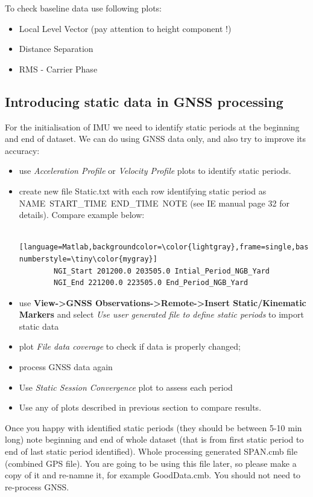 \documentclass[british]{book}
\renewcommand{\footnotesize}{\scriptsize} %
\begin{document}
To check baseline data use following plots:

\begin{itemize}
	\item Local Level Vector (pay attention to height component !)
	\item Distance Separation
	\item RMS - Carrier Phase
\end{itemize}

\subsection{Introducing static data in GNSS processing}

For the initialisation of IMU we need to identify static periods at the beginning and end of dataset. We can do using GNSS data only, and also try to improve its accuracy:

\begin{itemize}
\item use \emph{Acceleration Profile} or \emph{Velocity Profile} plots to
identify static periods.
\item create new file Static.txt with each row identifying static period as NAME~START\_TIME~END\_TIME~NOTE (see IE manual page 32 for details). Compare example below: 
	\begin{lstlisting} [language=Matlab,backgroundcolor=\color{lightgray},frame=single,basicstyle=\footnotesize,numbers=left,numbersep=5pt, numberstyle=\tiny\color{mygray}]
		NGI_Start 201200.0 203505.0 Intial_Period_NGB_Yard
		NGI_End 221200.0 223505.0 End_Period_NGB_Yard
	\end{lstlisting}
\item use \textbf{View->GNSS Observations->Remote->Insert Static/Kinematic Markers} and select \textit{Use user generated file to define static periods} to import static data
\item plot \textit{File data coverage} to check if data is properly changed;
\item process GNSS data again
\item Use \emph{Static Session Convergence} plot to assess each period
\item Use any of plots described in previous section to compare results.
\end{itemize}

Once you happy with identified static periods (they should be between 5-10 min long) note beginning and end of whole dataset (that is from first static period to end of last static period identified). Whole processing  generated SPAN.cmb file (combined GPS file). You are going to be using this file later, so please make a copy of it and re-namne it, for example GoodData.cmb. You should not need to re-process GNSS.
\end{document}
